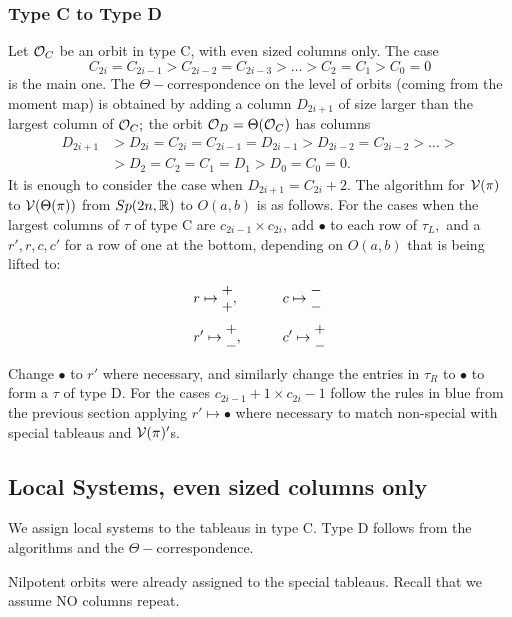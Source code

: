 \documentclass[11pt ,reqno]{amsart}
\begin{document}
\subsubsection{Type C to Type D} Let $\mathcal O_C$ be an orbit in type C, with even sized columns only. The case 
$$
C_{2i}=C_{2i-1}>C_{2i-2}=C_{2i-3}>\dots >C_{2}=C_1>C_0=0
$$
 is the main one.  The $\Theta-$correspondence on the level of orbits (coming from the moment map) is obtained by adding a column $D_{2i+1}$ of size larger than the largest column of $\mathcal O_C;$ the orbit $\mathcal O_D=\Theta(\mathcal O_C)$  has columns 
$$
\begin{aligned}
 D_{2i+1}&>D_{2i}=C_{2i}=C_{2i-1}=D_{2i-1}>D_{2i-2}=C_{2i-2}>\dots >\\
&>D_2=C_2=C_1=D_1>D_0=C_0=0. 
\end{aligned}
$$ 
It is enough to consider the case when   $D_{2i+1}=C_{2i}+2$.
The algorithm for ${\mathcal V}(\pi)$ to ${\mathcal V}(\Theta(\pi))$ from $Sp(2n,{\mathbb R})$ to
$O(a,b)$ is as follows. For the cases when the largest columns of
$\tau$ of type C are $c_{2i-1}\times c_{2i}$, add
$\bullet$ to each row of $\tau_L,$ and a $r',r,c,c'$ for a row of one
at the bottom, depending on $O(a,b)$ that is being lifted to:
$$
\begin{aligned}
  &r\mapsto \begin{matrix} +\\+\end{matrix},\qquad  &&c\mapsto \begin{matrix} -\\-\end{matrix} \\
  &r'\mapsto \begin{matrix} +\\-\end{matrix},\qquad  &&c'\mapsto \begin{matrix} +\\-\end{matrix} 
\end{aligned}
$$
Change $\bullet$ to $r'$ where
necessary,  and similarly change the entries in $\tau_R$ to $\bullet$
to form a $\tau$  of type D. For the cases $c_{2i-1}+1\times c_{2i}-1$
follow the rules in blue from the previous section applying
$r'\mapsto\bullet$ where necessary to match non-special with special
tableaus and ${\mathcal V}(\pi)'$s.



\subsection{Local Systems, even sized columns only}
We assign local systems to the tableaus in type C. Type D follows from
the algorithms and the $\Theta-$correspondence.

Nilpotent orbits were already assigned to the special tableaus.  
{\clrblu Recall that we assume NO columns repeat}.
\end{document}
